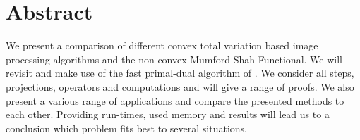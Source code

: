 \chapter*{Abstract} %
\label{cha:abstract}

    We present a comparison of different convex total variation based image processing algorithms and the non-convex Mumford-Shah Functional. We will revisit and make use of the fast primal-dual algorithm of \cite{Pock-et-al-iccv09}. We consider all steps, projections, operators and computations and will give a range of proofs. We also present a various range of applications and compare the presented methods to each other. Providing run-times, used memory and results will lead us to a conclusion which problem fits best to several situations. 
    

\newpage
